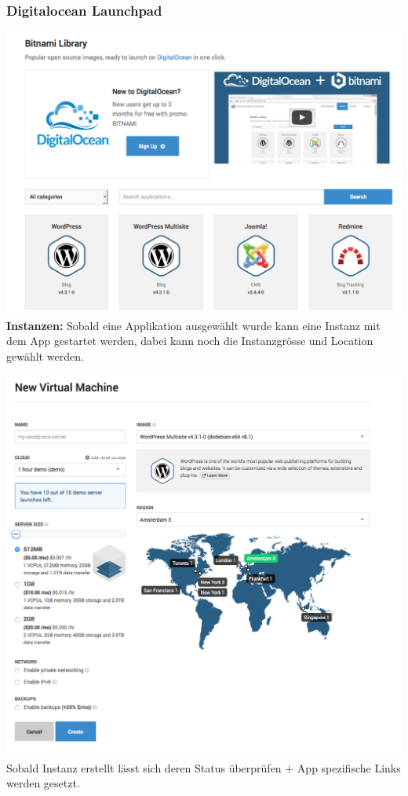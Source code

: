 \subsubsection{Digitalocean Launchpad}
\includegraphics[width=\textwidth]{./03_Analyse/03_Bitnami/images/digitalocean_launchpad}
\textbf{Instanzen:}
Sobald eine Applikation ausgewählt wurde kann eine Instanz mit dem App gestartet 
werden, dabei kann noch die Instanzgrösse und Location gewählt werden.

\includegraphics[width=\textwidth]{./03_Analyse/03_Bitnami/images/digitalocean_size}
Sobald Instanz erstellt lässt sich deren Status überprüfen + App spezifische 
Links werden gesetzt.

